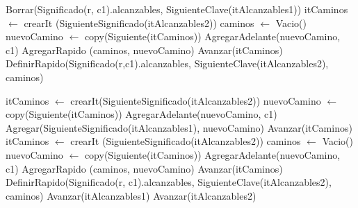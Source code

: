 \begin{Algoritmos}
\begin{algorithm}
\begin{algorithmic}[0]
				\State Borrar(Significado(r, c1).alcanzables, SiguienteClave(itAlcanzables1))
				\State itCaminos $\gets$ crearIt (SiguienteSignificado(itAlcanzables2))
				\State caminos $\gets$ Vacio() 
					\State nuevoCamino $\gets$ copy(Siguiente(itCaminos)) 
					\State AgregarAdelante(nuevoCamino, c1)
					\State AgregarRapido (caminos, nuevoCamino)
					\State Avanzar(itCaminos)
				\EndWhile
				\State DefinirRapido(Significado(r,c1).alcanzables, SiguienteClave(itAlcanzables2), caminos)
			
			\Else 
					\State itCaminos $\gets$ crearIt(SiguienteSignificado(itAlcanzables2))
						\State nuevoCamino $\gets$ copy(Siguiente(itCaminos)) 
						\State AgregarAdelante(nuevoCamino, c1)
						\State Agregar(SiguienteSignificado(itAlcanzables1), nuevoCamino)
						\State Avanzar(itCaminos)
					\EndWhile
				\EndIf
			\EndIf
		\Else
			\State itCaminos $\gets$ crearIt (SiguienteSignificado(itAlcanzables2))
			\State caminos $\gets$ Vacio() 
				\State nuevoCamino $\gets$ copy(Siguiente(itCaminos)) 
				\State AgregarAdelante(nuevoCamino, c1)
				\State AgregarRapido (caminos, nuevoCamino)
				\State Avanzar(itCaminos)
			\EndWhile
			\State DefinirRapido(Significado(r, c1).alcanzables, SiguienteClave(itAlcanzables2), caminos)
		\EndIf
		\State Avanzar(itAlcanzables1)
	\EndWhile
	\State Avanzar(itAlcanzables2)
\EndWhile
\EndFunction
\end{algorithmic}
\end{algorithm}		
				

\end{Algoritmos}
